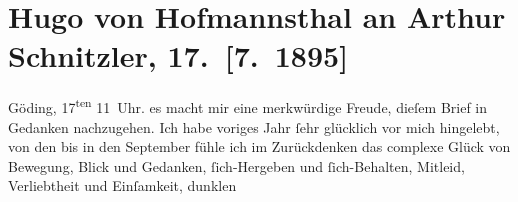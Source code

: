 

         
         \renewcommand{\erwaehntePersonen}{Personen: Richard Beer-Hofmann, Paul Goldmann, Hugo von Hofmannsthal, Edgar von Karg-Bebenburg, Felix Salten}
         \renewcommand{\erwaehnteOrte}{Orte: Bad Ischl, Hodonín, Hotel und Pension Rudolfshöhe (Leopold Petter), Salesianergasse, Salzburg}
         \renewcommand{\erwaehnteWerke}{Werke: Pan}
               \section[Hugo von Hofmannsthal an Arthur Schnitzler, 17. {[}7. 1895{]}]{ Hugo von Hofmannsthal an Arthur Schnitzler, 17. {[}7. 1895{]}}\nopagebreak{}\rehead{ }\begin{ledgroupsized}[t]{13cm}\normalsize\beginnumbering{} \toendnotes[C]{\smallbreak\pagebreak[2]} 
\toendnotes[C]{\smallbreak}\pstart
           \raggedleft{}{\pb}Göding, 17\textsuperscript{ten}{ }11 Uhr. \pend
           \pstart
           \raggedleft{}\textcolor{gray}{\textbf{}}\pend
           \pstart
           es macht mir eine merkwürdige Freude, dieſem Brief in Gedanken nachzugehen. Ich habe
               voriges Jahr ſehr glücklich vor mich hingelebt, von den \label{K_L00464-1v}\label{K_L00464-1h} bis in den September
               fühle ich im Zurückdenken das complexe Glück von Bewegung, Blick und Gedanken,
               ſich-Hergeben und ſich-Behalten, Mitleid, Verliebtheit und Einſamkeit, dunklen

\end{ledgroupsized}
